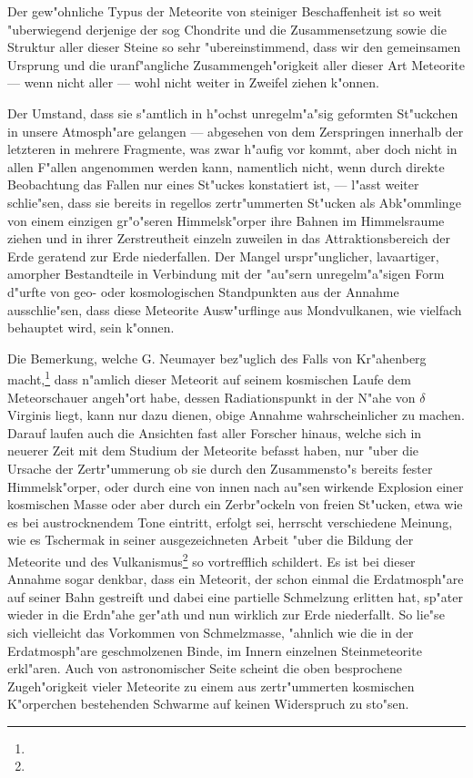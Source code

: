 \documentclass[a4paper, 11pt, oneside]{article}
\begin{document}
Der gew"ohnliche Typus der Meteorite von steiniger Beschaffenheit ist so weit "uberwiegend derjenige der sog Chondrite und die Zusammensetzung sowie die Struktur aller dieser Steine so sehr "ubereinstimmend, dass wir den gemeinsamen Ursprung und die uranf"angliche Zusammengeh"origkeit aller dieser Art Meteorite --- wenn nicht aller --- wohl nicht weiter in Zweifel ziehen k"onnen.

Der Umstand, dass sie s"amtlich in h"ochst unregelm"a"sig geformten St"uckchen in unsere Atmosph"are gelangen --- abgesehen von dem Zerspringen innerhalb der letzteren in mehrere Fragmente, was zwar h"aufig vor kommt, aber doch nicht in allen F"allen angenommen werden kann, namentlich nicht, wenn durch direkte Beobachtung das Fallen nur eines St"uckes konstatiert ist, --- l"asst weiter schlie"sen, dass sie bereits in regellos zertr"ummerten St"ucken als Abk"ommlinge von einem einzigen gr"o"seren Himmelsk"orper ihre Bahnen im Himmelsraume ziehen und in ihrer Zerstreutheit einzeln zuweilen in das Attraktionsbereich der Erde geratend zur Erde niederfallen. Der Mangel urspr"unglicher, lavaartiger, amorpher Bestandteile in Verbindung mit der "au"sern unregelm"a"sigen Form d"urfte von geo- oder kosmologischen Standpunkten aus der Annahme ausschlie"sen, dass diese Meteorite Ausw"urflinge aus Mondvulkanen, wie vielfach behauptet wird, sein k"onnen.

Die Bemerkung, welche G. Neumayer bez"uglich des Falls von Kr"ahenberg macht,\footnote{} dass n"amlich dieser Meteorit auf seinem kosmischen Laufe dem Meteorschauer angeh"ort habe, dessen Radiationspunkt in der N"ahe von $\delta$ Virginis liegt, kann nur dazu dienen, obige Annahme wahrscheinlicher zu machen. Darauf laufen auch die Ansichten fast aller Forscher hinaus, welche sich in neuerer Zeit mit dem Studium der Meteorite befasst haben, nur "uber die Ursache der Zertr"ummerung ob sie durch den Zusammensto"s bereits fester Himmelsk"orper, oder durch eine von innen nach au"sen wirkende Explosion einer kosmischen Masse oder aber durch ein Zerbr"ockeln von freien St"ucken, etwa wie es bei austrocknendem Tone eintritt, erfolgt sei, herrscht verschiedene Meinung, wie es Tschermak in seiner ausgezeichneten Arbeit "uber die Bildung der Meteorite und des Vulkanismus\footnote{} so vortrefflich schildert. Es ist bei dieser Annahme sogar denkbar, dass ein Meteorit, der schon einmal die Erdatmosph"are auf seiner Bahn gestreift und dabei eine partielle Schmelzung erlitten hat, sp"ater wieder in die Erdn"ahe ger"ath und nun wirklich zur Erde niederfallt. So lie"se sich vielleicht das Vorkommen von Schmelzmasse, "ahnlich wie die in der Erdatmosph"are geschmolzenen Binde, im Innern einzelnen Steinmeteorite erkl"aren. Auch von astronomischer Seite scheint die oben besprochene Zugeh"origkeit vieler Meteorite zu einem aus zertr"ummerten kosmischen K"orperchen bestehenden Schwarme auf keinen Widerspruch zu sto"sen.
\end{document}
